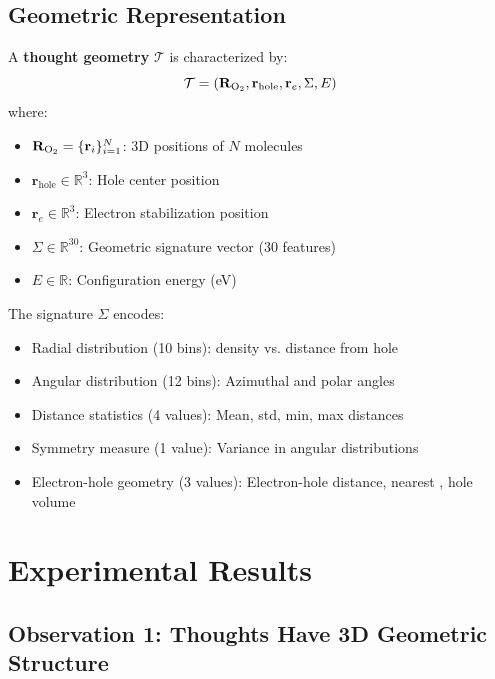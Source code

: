 \subsection{Geometric Representation}

\begin{definition}
\label{def:thought_geometry_experimental}
A \textbf{thought geometry} $\mathcal{T}$ is characterized by:
\begin{equation}
\mathcal{T} = (\mathbf{R}_{\ce{O2}}, \mathbf{r}_{\text{hole}}, \mathbf{r}_e, \Sigma, E)
\end{equation}
where:
\begin{itemize}
\item $\mathbf{R}_{\ce{O2}} = \{\mathbf{r}_i\}_{i=1}^{N}$: 3D positions of $N$  molecules
\item $\mathbf{r}_{\text{hole}} \in \mathbb{R}^3$: Hole center position
\item $\mathbf{r}_e \in \mathbb{R}^3$: Electron stabilization position
\item $\Sigma \in \mathbb{R}^{30}$: Geometric signature vector (30 features)
\item $E \in \mathbb{R}$: Configuration energy (eV)
\end{itemize}
\end{definition}

The signature $\Sigma$ encodes:
\begin{itemize}
\item Radial distribution (10 bins):  density vs. distance from hole
\item Angular distribution (12 bins): Azimuthal and polar angles
\item Distance statistics (4 values): Mean, std, min, max distances
\item Symmetry measure (1 value): Variance in angular distributions
\item Electron-hole geometry (3 values): Electron-hole distance, nearest , hole volume
\end{itemize}

\section{Experimental Results}

\subsection{Observation 1: Thoughts Have 3D Geometric Structure}

